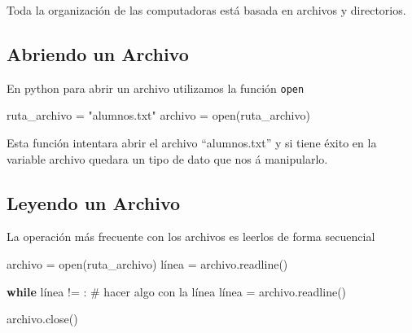 \documentclass[
  letterpaper,
  DIV=11,
  numbers=noendperiod]{scrreprt}
\newenvironment{Shaded}{\begin{snugshade}}{\end{snugshade}}
\newcommand{\BuiltInTok}[1]{\textcolor[rgb]{0.00,0.23,0.31}{#1}}
\newcommand{\CommentTok}[1]{\textcolor[rgb]{0.37,0.37,0.37}{#1}}
\newcommand{\ControlFlowTok}[1]{\textcolor[rgb]{0.00,0.23,0.31}{\textbf{#1}}}
\newcommand{\NormalTok}[1]{\textcolor[rgb]{0.00,0.23,0.31}{#1}}
\newcommand{\OperatorTok}[1]{\textcolor[rgb]{0.37,0.37,0.37}{#1}}
\newcommand{\StringTok}[1]{\textcolor[rgb]{0.13,0.47,0.30}{#1}}
\begin{document}
\begin{tcolorbox}[enhanced jigsaw, arc=.35mm, toptitle=1mm, colframe=quarto-callout-note-color-frame, bottomtitle=1mm, opacitybacktitle=0.6, colbacktitle=quarto-callout-note-color!10!white, leftrule=.75mm, coltitle=black, toprule=.15mm, titlerule=0mm, title=\textcolor{quarto-callout-note-color}{\faInfo}\hspace{0.5em}{Note}, bottomrule=.15mm, rightrule=.15mm, colback=white, breakable, opacityback=0, left=2mm]

Toda la organización de las computadoras está basada en archivos y
directorios.

\end{tcolorbox}

\subsection{Abriendo un Archivo}\label{abriendo-un-archivo}

En python para abrir un archivo utilizamos la función \texttt{open}

\begin{Shaded}
\begin{Highlighting}[]
\NormalTok{ruta\_archivo }\OperatorTok{=} \StringTok{"alumnos.txt"}
\NormalTok{archivo }\OperatorTok{=} \BuiltInTok{open}\NormalTok{(ruta\_archivo)}
\end{Highlighting}
\end{Shaded}

Esta función intentara abrir el archivo ``alumnos.txt'' y si tiene éxito
en la variable archivo quedara un tipo de dato que nos á manipularlo.

\subsection{Leyendo un Archivo}\label{leyendo-un-archivo}

La operación más frecuente con los archivos es leerlos de forma
secuencial

\begin{Shaded}
\begin{Highlighting}[]
\NormalTok{archivo }\OperatorTok{=} \BuiltInTok{open}\NormalTok{(ruta\_archivo)}
\NormalTok{línea }\OperatorTok{=}\NormalTok{ archivo.readline()}

\ControlFlowTok{while}\NormalTok{ línea }\OperatorTok{!=} \StringTok{\textquotesingle{}\textquotesingle{}}\NormalTok{:}
  \CommentTok{\# hacer algo con la línea}
\NormalTok{  línea }\OperatorTok{=}\NormalTok{ archivo.readline()}

\NormalTok{archivo.close()}
\end{Highlighting}
\end{Shaded}
\end{document}
